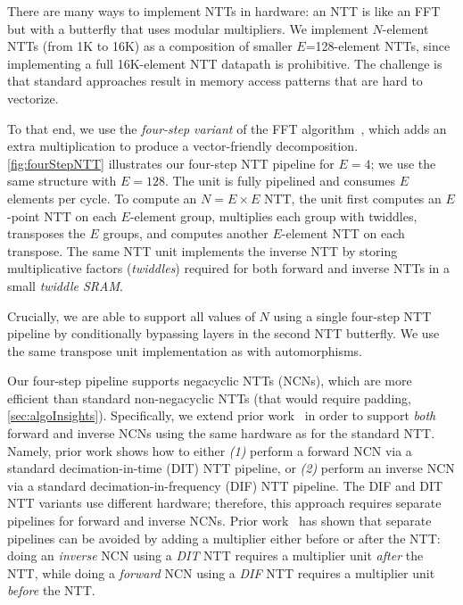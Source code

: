 There are many ways to implement NTTs in hardware:
an NTT is like an FFT~\cite{cooley:moc65:algorithm}
but with a butterfly that uses modular multipliers.
We implement $N$-element NTTs (from 1K to 16K) as a composition
of smaller $E$=128-element NTTs,
since implementing a full 16K-element NTT datapath is prohibitive.
The challenge is that standard approaches result in memory access patterns
that are hard to vectorize.

\figFourStepNTT

To that end, we use the \textit{four-step variant} of the FFT algorithm~\cite{bailey:supercomputing89:FFTs},
which adds an extra multiplication to produce a vector-friendly decomposition.
\autoref{fig:fourStepNTT} illustrates 
our
four-step NTT pipeline for $E=4$;
we use the same structure with $E=128$.
The unit is fully pipelined and consumes $E$ elements per cycle.
To compute an $N=E\times E$ NTT, the unit first computes an $E$-point NTT on each $E$-element group,
multiplies each group with twiddles,
transposes the $E$ groups, and computes another $E$-element NTT on each transpose.
The same NTT unit implements the inverse NTT
by storing multiplicative factors (\textit{twiddles}) required for both forward and inverse NTTs in a small \textit{twiddle SRAM}.

Crucially, we are able to support all values of $N$ using a single four-step NTT pipeline by conditionally bypassing layers in the second NTT butterfly.
We use the same transpose unit implementation as with automorphisms.

Our four-step pipeline supports negacyclic NTTs (NCNs), which are more efficient than standard non-negacyclic NTTs (that would require padding, \autoref{sec:algoInsights}). Specifically, we extend prior work~\cite{poppelmann2015high,roy2014compact,lyubashevsky:tact10:ideal} in order to support \emph{both} forward and inverse NCNs using the same hardware as for the standard NTT. Namely, prior work shows how to either \emph{(1)} perform a forward NCN via a standard decimation-in-time (DIT) NTT pipeline, or \emph{(2)} perform an inverse NCN via a standard decimation-in-frequency (DIF) NTT pipeline. The DIF and DIT NTT variants use different hardware; therefore, this approach requires separate pipelines for forward and inverse NCNs. Prior work~\cite{lyubashevsky:tact10:ideal} has shown that separate pipelines can be avoided by adding a multiplier either before or after the NTT: doing an \emph{inverse} NCN using a \emph{DIT} NTT requires a multiplier unit \emph{after} the NTT, while doing a \emph{forward} NCN using a \emph{DIF} NTT requires a multiplier unit \emph{before} the NTT.

